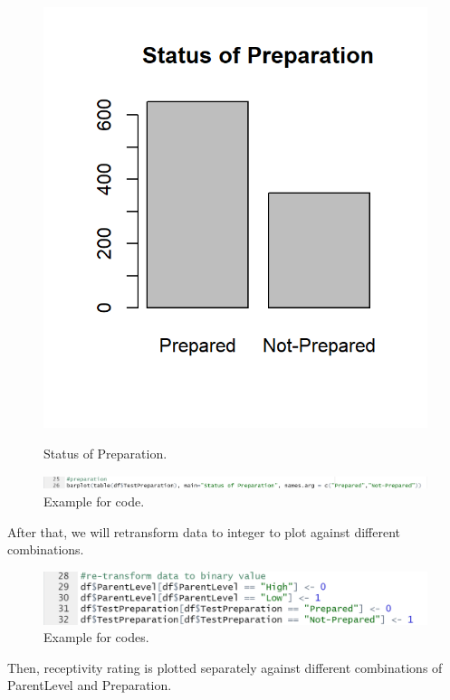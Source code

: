 \documentclass[a4paper]{article}
\begin{document}
\begin{figure}[H]
    \centering
    \begin{minipage}{0.5\textwidth}
        \centering
        \includegraphics[width = 0.8\linewidth]{Images/Activity2/10.png}
        \caption{Status of Preparation.}
        \label{fig:trans3}
    \end{minipage}%
    \begin{minipage}{0.5\textwidth}
        \centering
        \includegraphics[width = 1.2\linewidth]{Images/Activity2/9.png}
        \caption{Example for code.}
        \label{fig:trans2}
    \end{minipage}
\end{figure}
After that, we will retransform data to integer to plot against different combinations.
\begin{figure}[H]
    \centering
    \includegraphics[scale = 0.7]{Images/Activity2/11.png}
    \caption{Example for codes.}
    \label{fig:Trans4}
\end{figure}
Then, receptivity rating is plotted separately against different combinations of ParentLevel and Preparation.
\end{document}
